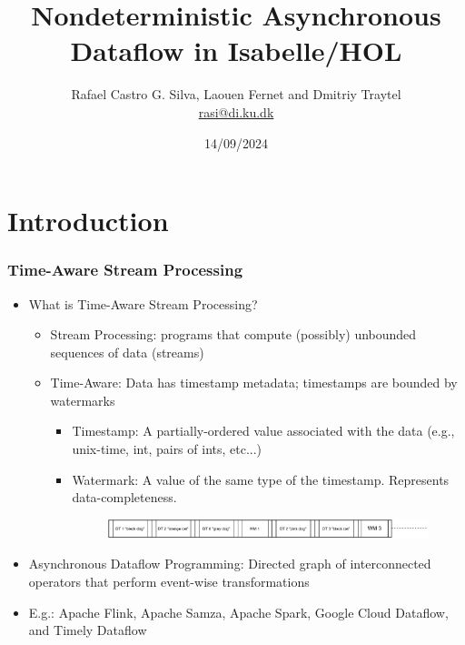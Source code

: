 \documentclass[aspectratio=169,10pt]{beamer}
\title[Nondeterministic Asynchronous Dataflow in Isabelle/HOL]{Nondeterministic Asynchronous Dataflow in Isabelle/HOL}
\author[Rafael Castro, Laouen Fernet and Dmitriy Traytel]{
  Rafael Castro G. Silva, Laouen Fernet and  Dmitriy Traytel\\\medskip
  {\small \url{rasi@di.ku.dk}}}
\date{14/09/2024}
\institute[UCPH]{
  Department of Computer Science \\
  University of Copenhagen}
\begin{document}

\begin{frame}
  \titlepage

\end{frame}
\section{Introduction}

\begin{frame}[fragile]
  \frametitle{Time-Aware Stream Processing}
  \begin{itemize}
    \item What is Time-Aware Stream Processing?
          \begin{itemize}
                  \pause
            \item Stream Processing: programs that compute (possibly) unbounded sequences of data (streams)
                  \pause
            \item Time-Aware: Data has timestamp metadata; timestamps are bounded by watermarks
                  \begin{itemize}
                    \item Timestamp: A partially-ordered value associated with the data (e.g., unix-time, int, pairs of ints, etc...)
                    \item Watermark: A value of the same type of the timestamp. Represents data-completeness.
                          \begin{figure}
                            \centering
                            \includegraphics[width=.75\textwidth]{stream_ex1.pdf}
                          \end{figure}
                  \end{itemize}
          \end{itemize}
          \pause
    \item Asynchronous Dataflow Programming: Directed graph of interconnected operators that perform event-wise transformations
    \item E.g.: Apache Flink, Apache Samza, Apache Spark, Google Cloud Dataflow, and Timely Dataflow
          \vspace*{-1ex}
          \begin{overlayarea}{\textwidth}{.1\textheight}
            \centering
            \begin{figure}

\end{figure}
\end{overlayarea}
\end{itemize}
\end{frame}
\end{document}
